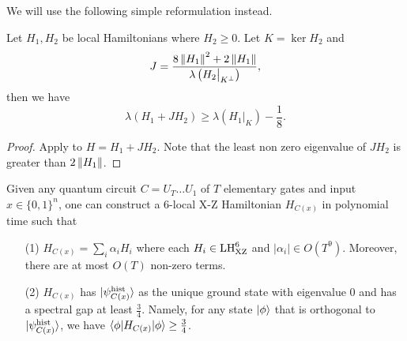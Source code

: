 We will use the following simple reformulation instead.

\begin{lem}
    \label{lem:projection}
    Let $H_1, H_2$ be local Hamiltonians where $H_2\geq0$. Let $K=\ker H_2$ and
    $$J=\frac{8\left\lVert H_1\right\rVert^2+ 2\left\lVert H_1\right\rVert}{\lambda\left(H_2\big|_{K^\bot}\right)},$$
    then we have
    $$\lambda(H_1+JH_2)\geq\lambda\left(H_1\big|_K\right)-\frac{1}{8}.$$
\end{lem}
\begin{proof}
    Apply  to $H=H_1+JH_2$. Note that the least non zero eigenvalue of $JH_2$ is greater than $2\left\lVert H_1\right\rVert$.
\end{proof}

\begin{thm}
    \label{thm:LHReduction}
    Given any quantum circuit $C = U_T \ldots U_1$ of  $T$ elementary gates and input $x \in \{0,1\}^n$, one can construct a 6-local X-Z Hamiltonian $H_{C(x)}$ in polynomial time such that
    \begin{enumerate}
        \item[(1)] $H_{C(x)} = \sum_i \alpha_i H_i$ where
        each $H_i \in \mathrm{LH}_{\mathrm{XZ}}^{6}$ and $|\alpha_i| \in O(T^9)$. Moreover, there are at most $O(T)$ non-zero terms.
        \item[(2)] $H_{C(x)}$ has $\ket{\psi_{C(x)}^{\mathrm{hist}}}$ as the unique ground state with eigenvalue $0$ and has a spectral gap at least $\frac{3}{4}$. Namely,  for any state $\ket\phi$ that is orthogonal to $\ket{\psi_{C(x)}^{\mathrm{hist}}}$, we have $\braket{\phi|H_{C(x)}|\phi}\geq \frac{3}{4}$.
    \end{enumerate}
\end{thm}


